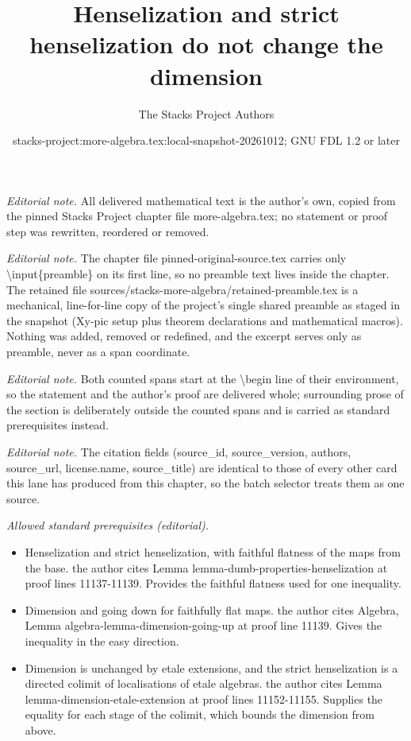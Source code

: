 \documentclass[10pt,a4paper]{amsart}
\title{Henselization and strict henselization do not change the dimension}
\author{The Stacks Project Authors}
\date{stacks-project:more-algebra.tex:local-snapshot-20261012; GNU FDL 1.2 or later}
\theoremstyle{plain}
\theoremstyle{definition}
\theoremstyle{remark}
\numberwithin{equation}{subsection}
\begin{document}
\maketitle
\setcounter{subsection}{1}
\noindent\textit{Editorial note.} All delivered mathematical text is the author's own, copied from the pinned Stacks Project chapter file more-algebra.tex; no statement or proof step was rewritten, reordered or removed.\par\medskip
\noindent\textit{Editorial note.} The chapter file pinned-original-source.tex carries only \textbackslash{}input\{preamble\} on its first line, so no preamble text lives inside the chapter. The retained file sources/stacks-more-algebra/retained-preamble.tex is a mechanical, line-for-line copy of the project's single shared preamble as staged in the snapshot (Xy-pic setup plus theorem declarations and mathematical macros). Nothing was added, removed or redefined, and the excerpt serves only as preamble, never as a span coordinate.\par\medskip
\noindent\textit{Editorial note.} Both counted spans start at the \textbackslash{}begin line of their environment, so the statement and the author's proof are delivered whole; surrounding prose of the section is deliberately outside the counted spans and is carried as standard prerequisites instead.\par\medskip
\noindent\textit{Editorial note.} The citation fields (source\_id, source\_version, authors, source\_url, license.name, source\_title) are identical to those of every other card this lane has produced from this chapter, so the batch selector treats them as one source.\par\medskip
\noindent\textit{Allowed standard prerequisites (editorial).}\begin{itemize}
\item Henselization and strict henselization, with faithful flatness of the maps from the base. the author cites Lemma lemma-dumb-properties-henselization at proof lines 11137-11139. Provides the faithful flatness used for one inequality.
\item Dimension and going down for faithfully flat maps. the author cites Algebra, Lemma algebra-lemma-dimension-going-up at proof line 11139. Gives the inequality in the easy direction.
\item Dimension is unchanged by etale extensions, and the strict henselization is a directed colimit of localisations of etale algebras. the author cites Lemma lemma-dimension-etale-extension at proof lines 11152-11155. Supplies the equality for each stage of the colimit, which bounds the dimension from above.
\end{itemize}\medskip
\end{document}
